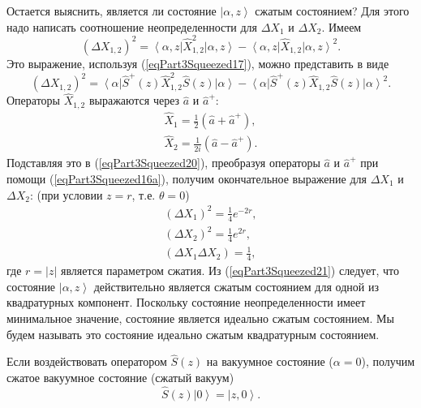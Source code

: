 Остается выяснить, является ли состояние $\left|\alpha, z\right>$
сжатым состоянием? Для этого надо написать соотношение
неопределенности для $\Delta X_1$  и $\Delta X_2$. Имеем
\begin{equation}
\left(\Delta X_{1,2}\right)^2 = 
\left<\alpha, z\right| \hat{X}_{1,2}^2\left|\alpha, z\right> -
\left<\alpha, z\right| \hat{X}_{1,2}\left|\alpha, z\right>^2.
\nonumber
\end{equation}
Это выражение, используя (\ref{eqPart3Squeezed17}), можно представить в
виде 
\begin{equation}
\left(\Delta X_{1,2}\right)^2 = 
\left<\alpha\right|\hat{S}^{+}\left(z\right) \hat{X}_{1,2}^2\hat{S}\left(z\right)\left|\alpha\right> -
\left<\alpha\right|\hat{S}^{+}\left(z\right) \hat{X}_{1,2}\hat{S}\left(z\right)\left|\alpha\right>^2.
\label{eqPart3Squeezed20}
\end{equation}
Операторы $\hat{X}_{1,2}$ выражаются через $\hat{a}$ и $\hat{a}^{+}$:
\begin{eqnarray}
\hat{X}_1 = \frac{1}{2}\left(\hat{a} + \hat{a}^{+}\right), 
\nonumber \\
\hat{X}_2 = \frac{1}{2 i}\left(\hat{a} - \hat{a}^{+}\right).
\nonumber
\end{eqnarray}
Подставляя это в (\ref{eqPart3Squeezed20}), преобразуя операторы
$\hat{a}$ и $\hat{a}^{+}$ при помощи (\ref{eqPart3Squeezed16a}),
получим окончательное выражение для $\Delta X_1$  и $\Delta X_2$:
(при условии $z = r$, т.е. $\theta = 0$)
\begin{eqnarray}
\left(\Delta X_1\right)^2 = \frac{1}{4}e^{-2 r},
\nonumber \\
\left(\Delta X_2\right)^2 = \frac{1}{4}e^{2 r},
\nonumber \\
\left(\Delta X_1 \Delta X_2\right) = \frac{1}{4},
\label{eqPart3Squeezed21}
\end{eqnarray}
где $r = \left|z\right|$ является параметром сжатия. Из
(\ref{eqPart3Squeezed21}) следует, что состояние $\left|\alpha,
z\right>$ действительно является сжатым состоянием для одной из
квадратурных компонент. Поскольку состояние неопределенности имеет
минимальное значение, состояние является идеально сжатым
состоянием. Мы будем называть это состояние идеально сжатым
квадратурным состоянием.

Если воздействовать оператором $\hat{S}\left(z\right)$ на вакуумное
состояние ($\alpha = 0$), получим сжатое вакуумное состояние (сжатый
вакуум)
\begin{equation}
\hat{S}\left(z\right)\left|0\right> = \left|z, 0\right>.
\nonumber
\end{equation}

